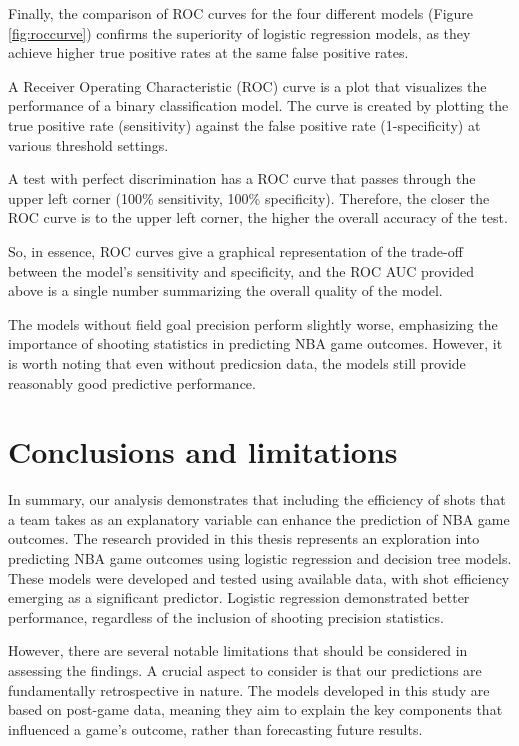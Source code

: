 \documentclass[
  12pt,
  a4paper,
]{article}
\begin{document}
Finally, the comparison of ROC curves for the four different models (Figure \ref{fig:roccurve}) confirms the superiority of logistic regression models, as they achieve higher true positive rates at the same false positive rates.

A Receiver Operating Characteristic (ROC) curve is a plot that visualizes the performance of a binary classification model. The curve is created by plotting the true positive rate (sensitivity) against the false positive rate (1-specificity) at various threshold settings.

A test with perfect discrimination has a ROC curve that passes through the upper left corner (100\% sensitivity, 100\% specificity). Therefore, the closer the ROC curve is to the upper left corner, the higher the overall accuracy of the test.

So, in essence, ROC curves give a graphical representation of the trade-off between the model's sensitivity and specificity, and the ROC AUC provided above is a single number summarizing the overall quality of the model.

The models without field goal precision perform slightly worse, emphasizing the importance of shooting statistics in predicting NBA game outcomes. However, it is worth noting that even without predicsion data, the models still provide reasonably good predictive performance.

\hypertarget{conclusions-and-limitations}{%
\section{Conclusions and limitations}\label{conclusions-and-limitations}}

In summary, our analysis demonstrates that including the efficiency of shots that a team takes as an explanatory variable can enhance the prediction of NBA game outcomes. The research provided in this thesis represents an exploration into predicting NBA game outcomes using logistic regression and decision tree models. These models were developed and tested using available data, with shot efficiency emerging as a significant predictor. Logistic regression demonstrated better performance, regardless of the inclusion of shooting precision statistics.

However, there are several notable limitations that should be considered in assessing the findings. A crucial aspect to consider is that our predictions are fundamentally retrospective in nature. The models developed in this study are based on post-game data, meaning they aim to explain the key components that influenced a game's outcome, rather than forecasting future results.
\end{document}
